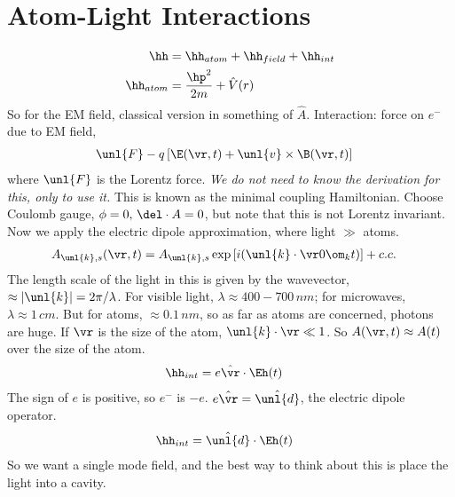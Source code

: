 \documentclass[a4paper, 11pt, normalem]{report}
\begin{document}
\section{Atom-Light Interactions}
\begin{align}
    \hh &= \hh_{atom} + \hh_{field} + \hh_{int} \\
    \hh_{atom} &= \frac{\hp^2}{2m} + \hat{V}(r) 
\end{align}
So for the EM field, classical version in something of $\hat{A}$.
Interaction: force on $e^-$ due to EM field,
\begin{align}
    \unl{F} &- q\left[\E(\vr,t) + \unl{v}\times\B(\vr,t)\right]
\end{align}
where $\unl{F}$ is the Lorentz force. \textit{We do not need to know the derivation for this, only to use it.}
This is known as the minimal coupling Hamiltonian. 
Choose Coulomb gauge, $\phi=0,\,\del\cdot A = 0$, but note that this is not Lorentz invariant.
Now we apply the electric dipole approximation, where light $\gg$ atoms.
\begin{align}
    A_{\unl{k},s}(\vr,t) &= A_{\unl{k},s}\exp\left[i(\unl{k}\cdot\vr 0 \om_kt)\right] + c.c.
\end{align}
The length scale of the light in this is given by the wavevector, $\approx |\unl{k}| = 2\pi/\lambda$.
For visible light, $\lambda \approx 400-700\,nm$; for microwaves, $\lambda \approx 1\,cm$.
But for atoms, $\approx 0.1\,nm$, so as far as atoms are concerned, photons are huge.
If $\vr$ is the size of the atom, $\unl{k}\cdot\vr \ll 1$.
So $A(\vr,t) \approx A(t)$ over the size of the atom.
\begin{align}
    \hh_{int} &= e\hat{\vr}\cdot\Eh(t)
\end{align}
The sign of $e$ is positive, so $e^-$ is $-e$.
$e\hat{\vr} = \hat{\unl{d}}$, the electric dipole operator.
\begin{align}
    \hh_{int} &= \hat{\unl{d}}\cdot\Eh(t)
\end{align}
So we want a single mode field, and the best way to think about this is place the light into a cavity.
\begin{figure}
    \centering
\end{figure}
\end{document}
